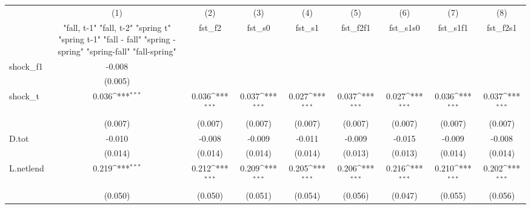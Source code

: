 {
\def\sym#1{\ifmmode^{#1}\else\(^{#1}\)\fi}
\begin{tabular}{l*{8}{c}}
\toprule
            &\multicolumn{1}{c}{(1)}&\multicolumn{1}{c}{(2)}&\multicolumn{1}{c}{(3)}&\multicolumn{1}{c}{(4)}&\multicolumn{1}{c}{(5)}&\multicolumn{1}{c}{(6)}&\multicolumn{1}{c}{(7)}&\multicolumn{1}{c}{(8)}\\
            &\multicolumn{1}{c}{  "fall, t-1" "fall, t-2" "spring t" "spring t-1"  "fall - fall" "spring - spring" "spring-fall" "fall-spring" }&\multicolumn{1}{c}{fst\_f2}&\multicolumn{1}{c}{fst\_s0}&\multicolumn{1}{c}{fst\_s1}&\multicolumn{1}{c}{fst\_f2f1}&\multicolumn{1}{c}{fst\_s1s0}&\multicolumn{1}{c}{fst\_s1f1}&\multicolumn{1}{c}{fst\_f2s1}\\
\midrule
shock\_f1    &      -0.008         &                     &                     &                     &                     &                     &                     &                     \\
            &     (0.005)         &                     &                     &                     &                     &                     &                     &                     \\
\addlinespace
shock\_t     &       0.036\sym{***}&       0.036\sym{***}&       0.037\sym{***}&       0.027\sym{***}&       0.037\sym{***}&       0.027\sym{***}&       0.036\sym{***}&       0.037\sym{***}\\
            &     (0.007)         &     (0.007)         &     (0.007)         &     (0.007)         &     (0.007)         &     (0.007)         &     (0.007)         &     (0.007)         \\
\addlinespace
D.tot       &      -0.010         &      -0.008         &      -0.009         &      -0.011         &      -0.009         &      -0.015         &      -0.009         &      -0.008         \\
            &     (0.014)         &     (0.014)         &     (0.014)         &     (0.014)         &     (0.013)         &     (0.013)         &     (0.014)         &     (0.014)         \\
\addlinespace
L.netlend   &       0.219\sym{***}&       0.212\sym{***}&       0.209\sym{***}&       0.205\sym{***}&       0.206\sym{***}&       0.216\sym{***}&       0.210\sym{***}&       0.202\sym{***}\\
            &     (0.050)         &     (0.050)         &     (0.051)         &     (0.054)         &     (0.056)         &     (0.047)         &     (0.055)         &     (0.056)         \\

\end{tabular}}
